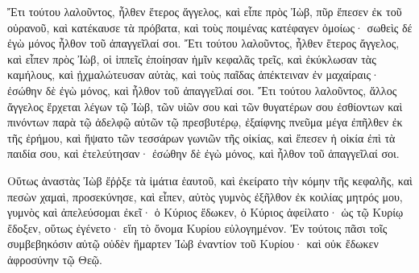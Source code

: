{Ἔτι τούτου λαλοῦντος, ἦλθεν ἕτερος ἄγγελος, καὶ εἶπε πρὸς Ἰὼβ, πῦρ ἔπεσεν ἐκ τοῦ οὐρανοῦ, καὶ κατέκαυσε τὰ πρόβατα, καὶ τοὺς ποιμένας κατέφαγεν ὁμοίως· σωθεὶς δέ ἐγὼ μόνος ἦλθον τοῦ ἀπαγγεῖλαί σοι.
Ἔτι τούτου λαλοῦντος, ἦλθεν ἕτερος ἄγγελος, καὶ εἶπεν πρὸς Ἰὼβ, οἱ ἱππεῖς ἐποίησαν ἡμῖν κεφαλᾶς τρεῖς, καὶ ἐκύκλωσαν τὰς καμήλους, καὶ ᾐχμαλώτευσαν αὐτὰς, καὶ τοὺς παῖδας ἀπέκτειναν ἐν μαχαίραις· ἐσώθην δὲ ἐγὼ μόνος, καὶ ἦλθον τοῦ ἀπαγγεῖλαί σοι.
Ἔτι τούτου λαλοῦντος, ἄλλος ἄγγελος ἔρχεται λέγων τῷ Ἰὼβ, τῶν υἱῶν σου καὶ τῶν θυγατέρων σου ἐσθίοντων καὶ πινόντων παρὰ τῷ ἀδελφῷ αὐτῶν τῷ πρεσβυτέρῳ,
ἐξαίφνης πνεῦμα μέγα ἐπῆλθεν ἐκ τῆς ἐρήμου, καὶ ἥψατο τῶν τεσσάρων γωνιῶν τῆς οἰκίας, καὶ ἔπεσεν ἡ οἰκία ἐπὶ τὰ παιδία σου, καὶ ἐτελεύτησαν· ἐσώθην δὲ ἐγὼ μόνος, καὶ ἦλθον τοῦ ἀπαγγεῖλαί σοι.
\par }{\PP {}Οὕτως ἀναστὰς Ἰὼβ ἔῤῥξε τὰ ἱμάτια ἑαυτοῦ, καὶ ἐκείρατο τὴν κόμην τῆς κεφαλῆς, καὶ πεσὼν χαμαὶ, προσεκύνησε, καὶ εἶπεν,
αὐτὸς γυμνὸς ἐξῆλθον ἐκ κοιλίας μητρός μου, γυμνὸς καὶ ἀπελεύσομαι ἐκεῖ· ὁ Κύριος ἔδωκεν, ὁ Κύριος ἀφείλατο· ὡς τῷ Κυρίῳ ἔδοξεν, οὕτως ἐγένετο· εἴη τὸ ὄνομα Κυρίου εὐλογημένον.
Ἐν τούτοις πᾶσι τοῖς συμβεβηκόσιν αὐτῷ οὐδὲν ἥμαρτεν Ἰὼβ ἐναντίον τοῦ Κυρίου· καὶ οὐκ ἔδωκεν ἀφροσύνην τῷ Θεῷ.

}
